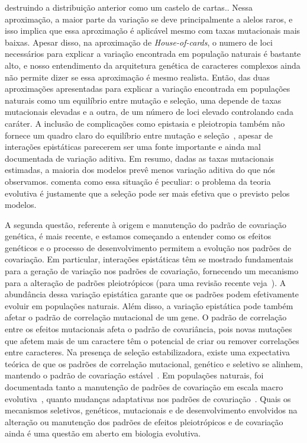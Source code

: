 \begin{refsection}
{destruindo a distribuição anterior como um castelo de cartas.}. Nessa
aproximação, a maior parte da variação se deve principalmente a alelos raros,
e isso implica que essa aproximação é aplicável mesmo com taxas mutacionais
mais baixas. Apesar disso, na aproximação de \textit{House-of-cards}, o numero
de loci necessários para explicar a variação encontrada em população naturais
é bastante alto, e nosso entendimento da arquitetura genética de caracteres
complexos ainda não permite dizer se essa aproximação é mesmo realista. Então,
das duas aproximações apresentadas para explicar a variação encontrada em
populações naturais como um equilíbrio entre mutação e seleção, uma depende de
taxas mutacionais elevadas e a outra, de um número de loci elevado controlando
cada caráter. A inclusão de complicações como epistasia e pleiotropia também
não fornece um quadro claro do equilíbrio entre mutação e
seleção~\parencite{Turelli1985-ne}, apesar de interações epistáticas parecerem
ser uma fonte importante e ainda mal documentada de variação aditiva. Em
resumo, dadas as taxas mutacionais estimadas, a maioria dos modelos prevê
menos variação aditiva do que nós observamos. \textcite{Rice2004-jf} comenta
como essa situação é peculiar: o problema da teoria evolutiva é justamente que
a seleção pode ser mais efetiva que o previsto pelos modelos.

A segunda questão, referente à origem e manutenção do padrão de covariação
genética, é mais recente, e estamos começando a entender como os efeitos
genéticos e o processo de desenvolvimento permitem a evolução nos padrões de
covariação. Em particular, interações epistáticas têm se mostrado fundamentais
para a geração de variação nos padrões de covariação, fornecendo um mecanismo
para a alteração de padrões pleiotrópicos (para uma revisão recente
veja~\textcite{Pavlicev2015-up}). A abundância dessa variação epistática
garante que os padrões podem efetivamente evoluir em populações naturais. Além
disso, a variação epistática pode também afetar o padrão de correlação
mutacional de um gene. O padrão de correlação entre os efeitos mutacionais
afeta o padrão de covariância, pois novas mutações que afetem mais de um
caractere têm o potencial de criar ou remover correlações entre caracteres. Na
presença de seleção estabilizadora, existe uma expectativa teórica de que os
padrões de correlação mutacional, genético e seletivo se alinhem, mantendo o
padrão de covariação estável~\parencite{Cheverud1984-mi}. Em populações
naturais, foi documentada tanto a manutenção de padrões de covariação em
escala macro evolutiva~\parencite{Marroig2001-ne}, quanto mudanças adaptativas
nos padrões de covariação~\parencite{Young2005-nk}. Quais os mecanismos
seletivos, genéticos, mutacionais e de desenvolvimento envolvidos na alteração
ou manutenção dos padrões de efeitos pleiotrópicos e de covariação ainda é uma
questão em aberto em biologia evolutiva.


\end{refsection}

